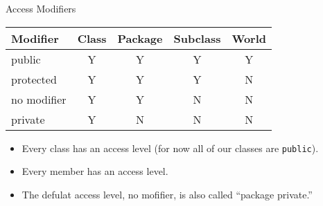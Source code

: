\documentclass{beamer}
\author[Chris Simpkins]
{Christopher Simpkins \\\texttt{chris.simpkins@gatech.edu}}
\institute[Georgia Tech] %
\date[CS 1331]{}
\begin{document}
\begin{frame}
  \titlepage
\end{frame}

\begin{frame}[fragile]{Access Modifiers}


\begin{center}
\begin{tabular}{|l|c|c|c|c|} \hline
Modifier & Class & Package & Subclass & World\\
\hline
public & Y & Y & Y & Y\\
protected & Y & Y & Y & N\\
no modifier & Y & Y & N & N\\
private & Y & N & N & N\\
\hline
\end{tabular}
\end{center}

\begin{itemize}
\item Every class has an access level (for now all of our classes are {\tt public}).
\item Every member has an access level.
\item The defulat access level, no mofifier, is also called ``package private.''
\end{itemize}

\end{frame}




\end{document}

